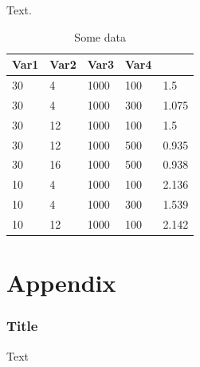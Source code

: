 \documentclass[12pt, pdftex, openany]{cmu_mse_dissertation}
\begin{document}
Text.

\begin{table}[H]
\small
\renewcommand{\arraystretch}{1.5}
\setlength{\tabcolsep}{5pt}
\caption{Some data}
\label{tab:tsne_bayes_table}
\begin{tabularx}{\textwidth}{p{} p{} p{} p{} X}
Var1 & Var2 & Var3 & Var4 \\ \hline %
30 & 4 & 1000 & 100 & 1.5 \\
30 & 4 & 1000 & 300 & 1.075 \\
30 & 12 & 1000 & 100 & 1.5 \\
30 & 12 & 1000 & 500 & 0.935 \\
30 & 16 & 1000 & 500 & 0.938 \\
10 & 4 & 1000 & 100 & 2.136 \\
10 & 4 & 1000 & 300 & 1.539 \\
10 & 12 & 1000 & 100 & 2.142 \\
\bottomrule %
\end{tabularx}
\end{table}


\appendix

\chapter{Appendix}
\renewcommand{\thesubsection}{A\arabic{subsection}}     %
\renewcommand{\thefigure}{A\arabic{figure}}             %
\setcounter{figure}{0}                                  %
\renewcommand{\thetable}{A\arabic{table}}               %
\setcounter{table}{0}


\subsection{Title}
Text


\backmatter

\titleformat{\chapter}[display]{\normalfont\bfseries}{}{0pt}{\Huge}
\clearpage
\printbibliography[title=References]
\end{document}
